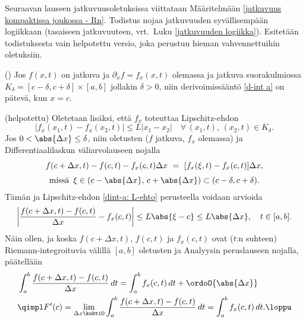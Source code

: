 Seuraavan lauseen jatkuvuusoletuksissa viittataan Määritelmään
\ref{jatkuvuus kompaktissa joukossa - Rn}. Todistus nojaa jatkuvuuden syvällisempään
logiikkaan (tasaiseen jatkuvuuteen, vrt.\ Luku \ref{jatkuvuuden logiikka}). Esitetään
todistuksesta vain helpotettu versio, joka perustuu hieman vahvennettuihin oletuksiin.
\begin{*Lause} \label{derivointi integraalin alla} 
() Jos
$f(x,t)$ on jatkuva ja $\partial_x f=f_x(x,t)$  olemassa ja jatkuva suorakulmiossa
$K_\delta=[c-\delta,c+\delta]\times[a,b]$ jollakin $\delta>0$,
niin derivoimissääntö \eqref{d-int a} on pätevä, kun $x=c$.
\end{*Lause}
\tod (helpotettu) Oletetaan lisäksi, että $f_x$ toteuttaa Lipschitz-ehdon
\begin{equation} \label{dint-a: L-ehto}
|f_x(x_1,t)-f_x(x_2,t)| \le L|x_1-x_2| \quad 
                        \forall\,(x_1,t),\,(x_2,t) \in K_\delta. \tag{$\star$}
\end{equation}
Jos $0<\abs{\Delta x}\le\delta$, niin oletusten ($f$ jatkuva, $f_x$ olemassa) ja
Differentiaalilaskun väliarvolauseen nojalla
\begin{multline*}
f(c+\Delta x,t)-f(c,t)-f_x(c,t)\Delta x\ =\ [f_x(\xi,t)-f_x(c,t)]\Delta x, \\[1mm]
        \text{missä}\,\ \xi\in(c-\abs{\Delta x},\,c+\abs{\Delta x})\subset(c-\delta,c+\delta).
\end{multline*}
Tämän ja Lipschitz-ehdon \eqref{dint-a: L-ehto} perusteella voidaan arvioida
\[
\left|\frac{f(c+\Delta x,t)-f(c,t)}{\Delta x}-f_x(c,t)\right| 
                \le L\abs{\xi-c} \le L\abs{\Delta x}, \quad t\in[a,b].
\]
Näin ollen, ja koska $f(c+\Delta x,t)$, $f(c,t)$ ja $f_x(c,t)$ ovat ($t$:n suhteen) 
Riemann-integroituvia välillä $[a,b]$ oletusten ja Analyysin peruslauseen nojalla, päätellään
\begin{align*}
&\int_a^b \frac{f(c+\Delta x,t)-f(c,t)}{\Delta x}\,dt 
              = \int_a^b f_x(c,t)\,dt + \ordoO{\abs{\Delta x}} \\
&\qimpl F'(c) = \lim_{\Delta x \kohti 0} \int_a^b \frac{f(c+\Delta x,t)-f(c,t)}{\Delta x}\,dt 
              = \int_a^b f_x(c,t)\,dt. \loppu
\end{align*}


